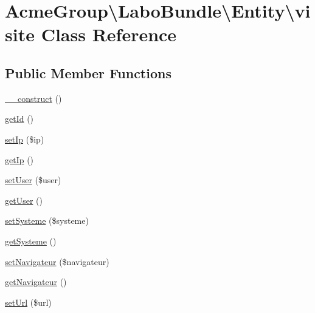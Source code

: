 \hypertarget{class_acme_group_1_1_labo_bundle_1_1_entity_1_1visite}{\section{Acme\+Group\textbackslash{}Labo\+Bundle\textbackslash{}Entity\textbackslash{}visite Class Reference}
\label{class_acme_group_1_1_labo_bundle_1_1_entity_1_1visite}
}
\subsection*{Public Member Functions}
\begin{DoxyCompactItemize}
\item 
\hyperlink{class_acme_group_1_1_labo_bundle_1_1_entity_1_1visite_a26bc3bfa2e02e25a518f1e03c2d1c1e4}{\+\_\+\+\_\+construct} ()
\item 
\hyperlink{class_acme_group_1_1_labo_bundle_1_1_entity_1_1visite_af8b6ed0e4cc6b8a726d6b340267bf706}{get\+Id} ()
\item 
\hyperlink{class_acme_group_1_1_labo_bundle_1_1_entity_1_1visite_a7b905b608fdc3888bdda7c39955ecfaf}{set\+Ip} (\$ip)
\item 
\hyperlink{class_acme_group_1_1_labo_bundle_1_1_entity_1_1visite_a7402ef05e3236e634a11e135d0ad7592}{get\+Ip} ()
\item 
\hyperlink{class_acme_group_1_1_labo_bundle_1_1_entity_1_1visite_ac243aeb16ab4ae7e3504980b09717ae9}{set\+User} (\$user)
\item 
\hyperlink{class_acme_group_1_1_labo_bundle_1_1_entity_1_1visite_a9e0159769fad00bf0193ad0d0a84aa43}{get\+User} ()
\item 
\hyperlink{class_acme_group_1_1_labo_bundle_1_1_entity_1_1visite_a50519bd6f9503b0875f22850dc39a5c5}{set\+Systeme} (\$systeme)
\item 
\hyperlink{class_acme_group_1_1_labo_bundle_1_1_entity_1_1visite_a0024d0b497dae943880e150b13a910a7}{get\+Systeme} ()
\item 
\hyperlink{class_acme_group_1_1_labo_bundle_1_1_entity_1_1visite_a6c17306f1899c0e50c2c56ff025a3826}{set\+Navigateur} (\$navigateur)
\item 
\hyperlink{class_acme_group_1_1_labo_bundle_1_1_entity_1_1visite_aa40a3d82999ef6ee57804be2d989e8ad}{get\+Navigateur} ()
\item 
\hyperlink{class_acme_group_1_1_labo_bundle_1_1_entity_1_1visite_a7a693ddb1ae977d487f9d7f7ebc90df2}{set\+Url} (\$url)

\end{DoxyCompactItemize}
